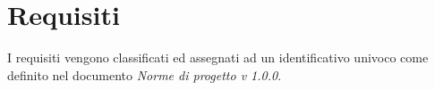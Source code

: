 
\section{Requisiti} 
I requisiti vengono classificati ed assegnati ad un identificativo  univoco come definito nel documento \textit{Norme di progetto v 1.0.0}.
\renewcommand{\arraystretch}{1.5}





